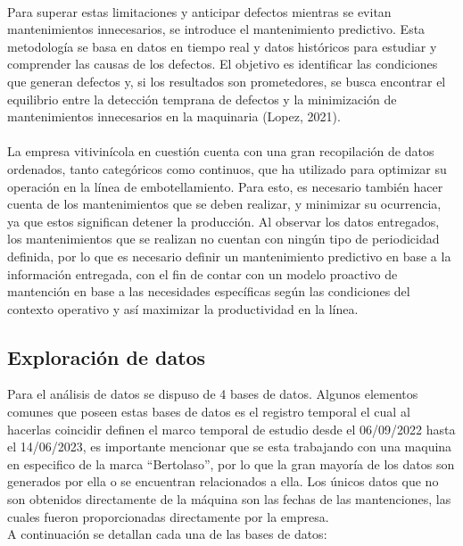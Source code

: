 \documentclass[10pt]{article}
\begin{document}
\\
Para superar estas limitaciones y anticipar defectos mientras se evitan mantenimientos innecesarios, se introduce el mantenimiento predictivo. Esta metodología se basa en datos en tiempo real y datos históricos para estudiar y comprender las causas de los defectos. El objetivo es identificar las condiciones que generan defectos y, si los resultados son prometedores, se busca encontrar el equilibrio entre la detección temprana de defectos y la minimización de mantenimientos innecesarios en la maquinaria (Lopez, 2021).\\
\\
La empresa vitivinícola en cuestión cuenta con una gran recopilación de datos ordenados, tanto categóricos como continuos, que ha utilizado para optimizar su operación en la línea de embotellamiento. Para esto, es necesario también hacer cuenta de los mantenimientos que se deben realizar, y minimizar su ocurrencia, ya que estos significan detener la producción. Al observar los datos entregados, los mantenimientos que se realizan no cuentan con ningún tipo de periodicidad definida, por lo que es necesario definir un mantenimiento predictivo en base a la información entregada, con el fin de contar con un modelo proactivo de mantención en base a las necesidades específicas según las condiciones del contexto operativo y así maximizar la productividad en la línea.

\subsection{Exploración de datos}

Para el análisis de datos se dispuso de 4 bases de datos. Algunos elementos comunes que poseen estas bases de datos es el registro temporal el cual al hacerlas coincidir definen el marco temporal de estudio desde el 06/09/2022 hasta el 14/06/2023, es importante mencionar que se esta trabajando con una maquina en especifico de la marca ``Bertolaso'', por lo que la gran mayoría de los datos son generados por ella o se encuentran relacionados a ella. Los únicos datos que no son obtenidos directamente de la máquina son las fechas de las mantenciones, las cuales fueron proporcionadas directamente por la empresa.\\

A continuación se detallan cada una de las bases de datos:\\
\end{document}
